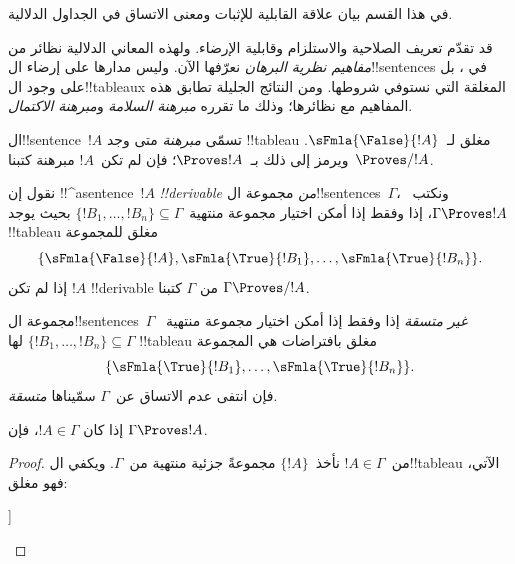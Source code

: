 \documentclass[../../../include/open-logic-section]{subfiles}
\begin{document}
      {}
      {}
      

\begin{editorial}
في هذا القسم بيان علاقة القابلية للإثبات ومعنى الاتساق في الجداول الدلالية.
\end{editorial}

\begin{explain}
قد تقدّم تعريف الصلاحية والاستلزام وقابلية الإرضاء. ولهذه المعاني
الدلالية نظائر من \emph{مفاهيم نظرية البرهان} نعرّفها الآن.
وليس مدارها على إرضاء ال!!{sentence}s في
، بل على وجود
ال!!{tableau}x المغلقة التي نستوفي شروطها. ومن النتائج الجليلة
تطابق هذه المفاهيم مع نظائرها؛ وذلك ما تقرره
\emph{مبرهنة السلامة} و\emph{مبرهنة الاكتمال}.
\end{explain}


\begin{defn}[المبرهنات]
ال!!{sentence}~$!A$ تسمّى \emph{مبرهنة} متى وجد !!{tableau} مغلق
لـ~$\sFmla{\False}{!A}$. ويرمز إلى ذلك بـ~$\Proves !A$؛
فإن لم تكن~$!A$ مبرهنة كتبنا~$\Proves/ !A$.
\end{defn}

\begin{defn}[!!^{derivability}]
نقول إن !!^a{sentence}~$!A$ \emph{!!{derivable} من} مجموعة
ال!!{sentence}s~$\Gamma$، ونكتب~$\Gamma \Proves !A$، إذا وفقط إذا
أمكن اختيار مجموعة منتهية~$\{!B_1, \dots, !B_n\} \subseteq \Gamma$
بحيث يوجد !!{tableau} مغلق للمجموعة
\[
\{
  \sFmla{\False}{!A},
  \sFmla{\True}{!B_1}, \dots,
  \sFmla{\True}{!B_n}
  \}.
\]
إذا لم تكن $!A$ !!{derivable} من $\Gamma$ كتبنا $\Gamma \Proves/
!A$.
\end{defn}

\begin{defn}[الاتساق]
مجموعة ال!!{sentence}s~$\Gamma$ \emph{غير متسقة} إذا وفقط إذا
أمكن اختيار مجموعة منتهية~$\{!B_1, \dots, !B_n\} \subseteq \Gamma$
لها !!{tableau} مغلق بافتراضات هي المجموعة
\[
\{
  \sFmla{\True}{!B_1}, \dots,
  \sFmla{\True}{!B_n}  
  \}.
\]
فإن انتفى عدم الاتساق عن~$\Gamma$ سمّيناها \emph{متسقة}.
\end{defn}

\begin{prop}[الانعكاسية]
إذا كان $!A \in \Gamma$، فإن $\Gamma \Proves !A$.
\end{prop}

\begin{proof}
من~$!A \in \Gamma$ نأخذ~$\{!A\}$ مجموعةً جزئية منتهية
من~$\Gamma$. ويكفي ال!!{tableau} الآتي، فهو مغلق:
\begin{oltableau}
  [\sFmla{\False}{\formula{A}}, just = \TAss
    [\sFmla{\True}{\formula{A}}, just = \TAss,close]
  ]
\end{oltableau}
\end{proof}
  
\end{document}
